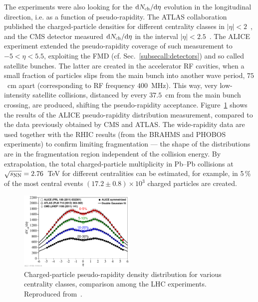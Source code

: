 The experiments were also looking for the ${\rm d}N_{\rm ch}/{\rm d}\eta$ evolution in the longitudinal direction, i.e. as a function of pseudo-rapidity. The ATLAS collaboration published the charged-particle densities for different centrality classes in $|\eta| < 2$~\cite{}, and the CMS detector measured ${\rm d}N_{\rm ch}/{\rm d}\eta$ in the interval $|\eta| < 2.5$~\cite{}. The ALICE experiment extended the pseudo-rapidity coverage of such measurement to $- 5 < \eta < 5.5$, exploiting the FMD (cf. Sec.~\ref{subsecall:detectors}) and so called satellite bunches. The latter are created in the accelerator RF cavities, when a small fraction of particles slips from the main bunch into another wave period, $75$~cm apart (corresponding to RF frequency $400$~MHz). This way, very low-intensity satellite collisions, distanced by every $37.5$~cm from the main bunch crossing, are produced, shifting the pseudo-rapidity acceptance. Figure~\ref{figks:MultEta} shows the results of the ALICE pseudo-rapidity distribution measurement, compared to the data previously obtained by CMS and ATLAS. The wide-rapidity data are used together with the RHIC results (from the BRAHMS and PHOBOS experiments) to confirm limiting fragmentation --- the shape of the distributions are in the fragmentation region independent of the collision energy. By extrapolation, the total charged-particle multiplicity in Pb--Pb collisions at $\sqrt{s_{\rm NN}} = 2.76$~TeV for different centralities can be estimated, for example, in 5\,\% of the most central events $(17.2 \pm 0.8) \times 10^3$ charged particles are created.

\begin{figure}
\centering
\includegraphics[width=0.5\textwidth]{ksfigures/MultEtaCent.pdf}
\caption{Charged-particle pseudo-rapidity density distribution for various centrality classes, comparison among the LHC experiments. Reproduced from~\cite{}.}
\label{figks:MultEta}
\end{figure}


